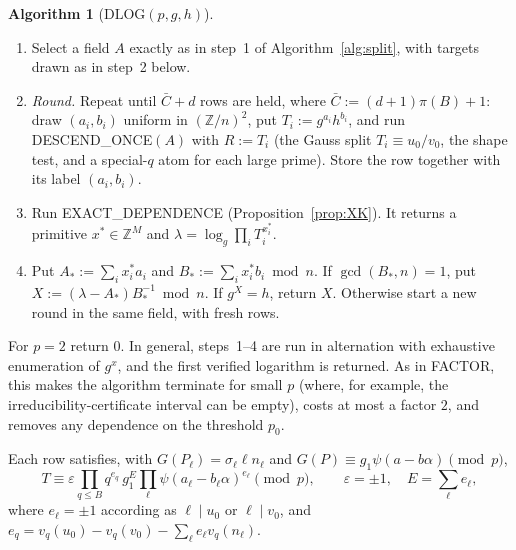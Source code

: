 \documentclass[11pt]{amsart}
\theoremstyle{definition}
\newtheorem{algorithm}[theorem]{Algorithm}
\newcommand{\Z}{\mathbb{Z}}
\begin{document}
\begin{algorithm}[$\mathrm{DLOG}(p,g,h)$]\label{alg:dlog}
\begin{enumerate}[label=\arabic*.]
\item Select a field $A$ exactly as in step~1 of Algorithm~\ref{alg:split}, with targets drawn as in step~2 below.
\item \emph{Round.} Repeat until $\bar C+d$ rows are held, where $\bar C:=(d+1)\pi(B)+1$: draw $(a_i,b_i)$ uniform in $(\Z/n)^2$, put
  $T_i:=g^{a_i}h^{b_i}$, and run DESCEND\_ONCE$(A)$ with $R:=T_i$ (the Gauss split $T_i\equiv u_0/v_0$, the shape test, and a special-$q$ atom for each
  large prime). Store the row together with its label $(a_i,b_i)$.
\item Run EXACT\_DEPENDENCE (Proposition~\ref{prop:XK}). It returns a primitive $x^*\in\Z^M$ and $\lambda=\log_g\prod_iT_i^{x^*_i}$.
\item Put $A_*:=\sum_ix^*_ia_i$ and $B_*:=\sum_ix^*_ib_i\bmod n$. If $\gcd(B_*,n)=1$, put $X:=(\lambda-A_*)B_*^{-1}\bmod n$. If $g^X=h$, return $X$.
  Otherwise start a new round in the same field, with fresh rows.
\end{enumerate}
For $p=2$ return $0$. In general, steps~1--4 are run in alternation with exhaustive enumeration of $g^x$, and the first verified logarithm is
returned. As in FACTOR, this makes the algorithm terminate for small $p$ (where, for example, the irreducibility-certificate interval
can be empty), costs at most a factor $2$, and removes any dependence on the threshold $p_0$.
\end{algorithm}

Each row satisfies, with $G(P_\ell)=\sigma_\ell\ell n_\ell$ and $G(P)\equiv g_1\psi(a-b\alpha)\pmod p$,
\begin{equation}\label{eq:DLrow}
T\equiv\varepsilon\prod_{q\le B}q^{e_q}\,g_1^E\prod_\ell\psi(a_\ell-b_\ell\alpha)^{e_\ell}\pmod p,\qquad \varepsilon=\pm1,\quad E=\sum_\ell e_\ell,
\end{equation}
where $e_\ell=\pm1$ according as $\ell\mid u_0$ or $\ell\mid v_0$, and $e_q=v_q(u_0)-v_q(v_0)-\sum_\ell e_\ell v_q(n_\ell)$.
\end{document}
